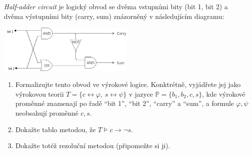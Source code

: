 \documentclass[a4paper,12pt]{article}
\begin{document}
\medskip\begin{problem}
    \emph{Half-adder circuit} je logický obvod se dvěma vstupními bity (bit 1, bit 2) a dvěma výstupními bity (carry, sum) znázorněný v následujícím diagramu:
    \begin{center}
        \includegraphics[width=0.5\textwidth]{files/half-adder.png}
    \end{center}
    \begin{enumerate}
            \item Formalizujte tento obvod ve výrokové logice. Konktrétně, vyjádřete jej jako výrokovou teorii $T=\{c\leftrightarrow \varphi,\ s\leftrightarrow \psi\}$ v jazyce $\mathbb P=\{b_1,b_2,c,s\}$, kde výrokové proměnné znamenají po řadě ``bit 1'', ``bit 2'', ``carry'' a ``sum'', a formule $\varphi,\psi$ neobsahují proměnné $c,s$.
            \item Dokažte tablo metodou, že $T\models c\to\neg s$.
            \item Dokažte totéž rezoluční metodou (připomeňte si ji).
    \end{enumerate}
    \end{problem}
\end{document}
